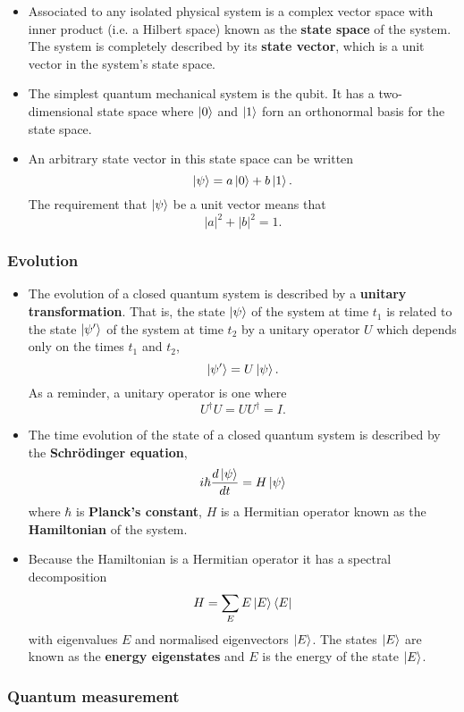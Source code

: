 \documentclass{article}
\begin{document}
\begin{itemize}
  \item Associated to any isolated physical system is a complex vector space with inner product (i.e. a Hilbert space) known as the \textbf{state space} of the system. The system is completely described by its \textbf{state vector}, which is a unit vector in the system's state space.

  \item The simplest quantum mechanical system is the qubit. It has a two-dimensional state space where $\ket{0}$ and $\ket{1}$ forn an orthonormal basis for the state space.

  \item An arbitrary state vector in this state space can be written \[\ket{\psi} = a \ket{0} + b \ket{1}.\] The requirement that $\ket{\psi}$ be a unit vector means that \[|a|^2 + |b|^2 = 1.\]
\end{itemize}

\subsubsection{Evolution}

\begin{itemize}
  \item The evolution of a closed quantum system is described by a \textbf{unitary transformation}. That is, the state $\ket{\psi}$ of the system at time $t_1$ is related to the state $\ket{\psi'}$ of the system at time $t_2$ by a unitary operator $U$ which depends only on the times $t_1$ and $t_2$, \[\ket{\psi'} = U \ket{\psi}.\] As a reminder, a unitary operator is one where \[U^\dagger U = U U^\dagger = I.\]

  \item The time evolution of the state of a closed quantum system is described by the \textbf{Schrödinger equation}, \[i \hbar \frac{d \ket{\psi}}{d t} = H \ket{\psi}\] where $\hbar$ is \textbf{Planck's constant}, $H$ is a Hermitian operator known as the \textbf{Hamiltonian} of the system.

  \item Because the Hamiltonian is a Hermitian operator it has a spectral decomposition \[H = \sum_E E \ket{E} \bra{E}\] with eigenvalues $E$ and normalised eigenvectors $\ket{E}$. The states $\ket{E}$ are known as the \textbf{energy eigenstates} and $E$ is the energy of the state $\ket{E}$.
\end{itemize}

\subsubsection{Quantum measurement}
\end{document}
